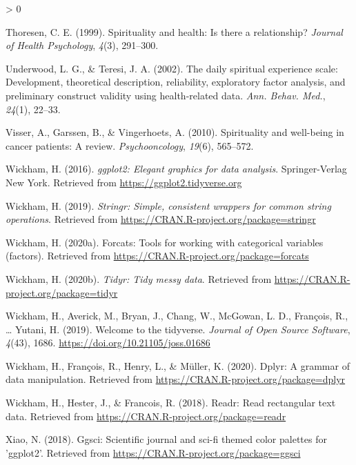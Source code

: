 \documentclass[
  english,
  man,floatsintext]{apa6}
\newlength{\cslhangindent}
\newenvironment{CSLReferences}[2] %
 {%
  \setlength{\parindent}{0pt}
  \ifodd #1 \everypar{\setlength{\hangindent}{\cslhangindent}}\ignorespaces\fi
  \ifnum #2 > 0
  \setlength{\parskip}{#2\baselineskip}
  \fi
 }%
 {}
\begin{document}
\begin{CSLReferences}{1}{0}
\leavevmode\hypertarget{ref-thoresen1999spirituality}{}%
Thoresen, C. E. (1999). Spirituality and health: Is there a relationship? \emph{Journal of Health Psychology}, \emph{4}(3), 291--300.

\leavevmode\hypertarget{ref-Underwood2002-hg}{}%
Underwood, L. G., \& Teresi, J. A. (2002). The daily spiritual experience scale: Development, theoretical description, reliability, exploratory factor analysis, and preliminary construct validity using health-related data. \emph{Ann. Behav. Med.}, \emph{24}(1), 22--33.

\leavevmode\hypertarget{ref-Visser2010-kq}{}%
Visser, A., Garssen, B., \& Vingerhoets, A. (2010). Spirituality and well-being in cancer patients: A review. \emph{Psychooncology}, \emph{19}(6), 565--572.

\leavevmode\hypertarget{ref-R-ggplot2}{}%
Wickham, H. (2016). \emph{ggplot2: Elegant graphics for data analysis}. Springer-Verlag New York. Retrieved from \url{https://ggplot2.tidyverse.org}

\leavevmode\hypertarget{ref-R-stringr}{}%
Wickham, H. (2019). \emph{Stringr: Simple, consistent wrappers for common string operations}. Retrieved from \url{https://CRAN.R-project.org/package=stringr}

\leavevmode\hypertarget{ref-R-forcats}{}%
Wickham, H. (2020a). Forcats: Tools for working with categorical variables (factors). Retrieved from \url{https://CRAN.R-project.org/package=forcats}

\leavevmode\hypertarget{ref-R-tidyr}{}%
Wickham, H. (2020b). \emph{Tidyr: Tidy messy data}. Retrieved from \url{https://CRAN.R-project.org/package=tidyr}

\leavevmode\hypertarget{ref-R-tidyverse}{}%
Wickham, H., Averick, M., Bryan, J., Chang, W., McGowan, L. D., François, R., \ldots{} Yutani, H. (2019). Welcome to the {tidyverse}. \emph{Journal of Open Source Software}, \emph{4}(43), 1686. \url{https://doi.org/10.21105/joss.01686}

\leavevmode\hypertarget{ref-R-dplyr}{}%
Wickham, H., François, R., Henry, L., \& Müller, K. (2020). Dplyr: A grammar of data manipulation. Retrieved from \url{https://CRAN.R-project.org/package=dplyr}

\leavevmode\hypertarget{ref-R-readr}{}%
Wickham, H., Hester, J., \& Francois, R. (2018). Readr: Read rectangular text data. Retrieved from \url{https://CRAN.R-project.org/package=readr}

\leavevmode\hypertarget{ref-R-ggsci}{}%
Xiao, N. (2018). Ggsci: Scientific journal and sci-fi themed color palettes for 'ggplot2'. Retrieved from \url{https://CRAN.R-project.org/package=ggsci}


\end{CSLReferences}
\end{document}
